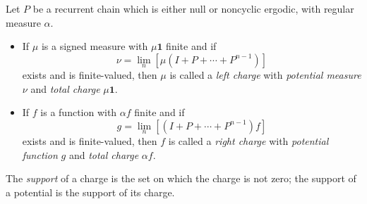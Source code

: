 Let $P$ be a recurrent chain which is either null or noncyclic ergodic, with regular measure $\alpha$.

\begin{itemize}
\item If $\mu$ is a signed measure with $\mu \mathbf{1}$ finite and if
$$\nu = \lim_n [\mu(I + P + \cdots + P^{n-1})]$$
exists and is finite-valued, then $\mu$ is called a \emph{left charge} with \emph{potential measure} $\nu$ and \emph{total charge} $\mu \mathbf{1}$.

\item If $f$ is a function with $\alpha f$ finite and if
$$g = \lim_n [(I + P + \cdots + P^{n-1})f]$$
exists and is finite-valued, then $f$ is called a \emph{right charge} with \emph{potential function} $g$ and \emph{total charge} $\alpha f$.
\end{itemize}

The \emph{support} of a charge is the set on which the charge is not zero; the support of a potential is the support of its charge.
